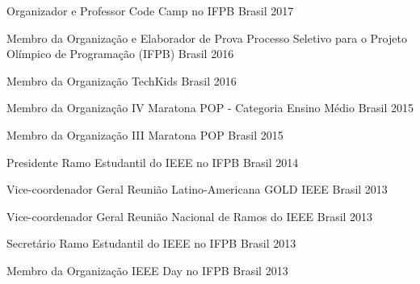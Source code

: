 \begin{cvhonors}
  
  \cvhonor
    {Organizador e Professor} %
    {Code Camp no IFPB} %
    {Brasil} %
    {2017} %
  
  \cvhonor
    {Membro da Organização e Elaborador de Prova} %
    {Processo Seletivo para o Projeto Olímpico de Programação (IFPB)} %
    {Brasil} %
    {2016} %
  
  \cvhonor
    {Membro da Organização} %
    {TechKids} %
    {Brasil} %
    {2016} %
  
  \cvhonor
    {Membro da Organização} %
    {IV Maratona POP - Categoria Ensino Médio} %
    {Brasil} %
    {2015} %
  
  \cvhonor
    {Membro da Organização} %
    {III Maratona POP} %
    {Brasil} %
    {2015} %
  
  \cvhonor
    {Presidente} %
    {Ramo Estudantil do IEEE no IFPB} %
    {Brasil} %
    {2014} %
  
  \cvhonor
    {Vice-coordenador Geral} %
    {Reunião Latino-Americana GOLD IEEE} %
    {Brasil} %
    {2013} %
  
  \cvhonor
    {Vice-coordenador Geral} %
    {Reunião Nacional de Ramos do IEEE} %
    {Brasil} %
    {2013} %
  
  \cvhonor
    {Secretário} %
    {Ramo Estudantil do IEEE no IFPB} %
    {Brasil} %
    {2013} %

\cvhonor
    {Membro da Organização} %
    {IEEE Day no IFPB} %
    {Brasil} %
    {2013} %

\end{cvhonors}
